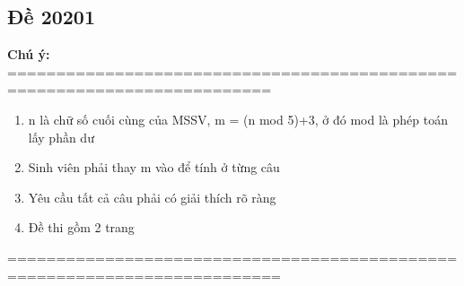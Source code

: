 \documentclass[12pt,oneside]{book}
\begin{document}
\subsection{Đề 20201}
{\bf Chú ý:}\\
=========================================================================
\begin{enumerate}
	\item n là chữ số cuối cùng của MSSV, m = (n mod 5)+3, ở đó mod là phép toán lấy phần dư
	\item Sinh viên phải thay m vào để tính ở từng câu
	\item Yêu cầu tất cả câu phải có giải thích rõ ràng
	\item Đề thi gồm 2 trang
\end{enumerate}
==========================================================================
\end{document}
